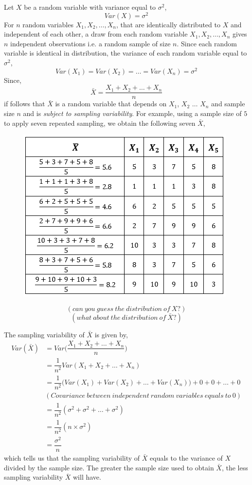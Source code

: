 \documentclass[12pt]{report}
\begin{document}
\noindent Let $X$ be a random variable with variance equal to $\sigma^2$,
$$Var(X) = \sigma^2$$
\noindent For $n$ random variables $X_1, X_2, \dots, X_n$, that are identically distributed to $X$ and independent of each other, a draw from each random variable $X_1, X_2, \dots, X_n$ gives $n$ independent observations i.e. a random sample of size $n$. Since each random variable is identical in distribution, the variance of each random variable equal to $\sigma^2$,
$$Var(X_1) = Var(X_2) = \dots = Var(X_n) = \sigma^2$$
\noindent Since, $$\bar{X} = \dfrac{X_1 + X_2 + \dots + X_n}{n}$$
\noindent if follows that $\bar{X}$ is a random variable that depends on $X_1$, $X_2$ $\dots$ $X_n$ and sample size $n$ and is \textit{subject to sampling variability}. For example, using a sample size of $5$ to apply seven repeated sampling, we obtain the following seven $\bar{X}$,
\begin{figure}[H]
	\centering
	\includegraphics{q1_7}
\end{figure}
\vspace{-\baselineskip}
$$(can\ you\ guess\ the\ distribution\ of\ \textit{X}?)$$ $$(what\ about\ the\ distribution\ of\ \bar{X}?)$$ 

\noindent The sampling variability of $\bar{X}$ is given by,
\begin{align*}
Var(\bar{X}) &= Var\Big(\dfrac{X_1 + X_2 + \dots + X_n}{n}\Big) \\
&= \dfrac{1}{n^2}Var(X_1 + X_2 + \dots + X_n) \\
&= \dfrac{1}{n^2}\Big(Var(X_1) + Var(X_2) + \dots + Var(X_n)\Big) + 0 + 0 + \dots + 0 \\
& (Covariance\ between\ independent\ random\ variables\ equals\ to\ 0) \\
&= \dfrac{1}{n^2}(\sigma^2 + \sigma^2 + \dots + \sigma^2) \\
&= \dfrac{1}{n^2}(n \times \sigma^2) \\ 
&= \dfrac{\sigma^2}{n}
\end{align*}
\noindent which tells us that the sampling variability of $\bar{X}$ equals to the variance of $X$ divided by the sample size. The greater the sample size used to obtain $\bar{X}$, the less sampling variability $\bar{X}$ will have.
\end{document}
